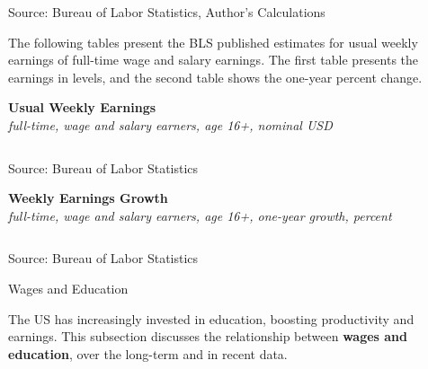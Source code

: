 \documentclass{report}
\newcommand{\tbllink}[1]{\href{https://raw.githubusercontent.com/bdecon/US-chartbook/master/chartbook/data/#1}{\faTable}}
\begin{document}
{\begin{minipage}{1.0\textwidth}
\footnotesize{Source: Bureau of Labor Statistics, Author's Calculations} \hfill \tbllink{uwe_bls_gr.csv} \ \ \tbllink{uwe_cps.csv}
\vspace{2mm}

\small The following tables present the BLS published estimates for usual weekly earnings of full-time wage and salary earnings. The first table presents the earnings in levels, and the second table shows the one-year percent change.
\vspace{2mm}

\normalsize \textbf{Usual Weekly Earnings}\\
\footnotesize{\textit{full-time, wage and salary earners, age 16+, nominal USD}}\\
 \setlength{\tabcolsep}{3.1pt} \color{black!90}
		{\renewcommand{\arraystretch}{1.55}
		 \begin{tabular}{p{17mm} R{8.8mm} R{8.8mm} R{8.8mm} R{8.8mm} R{8.8mm} R{8.8mm} 
		   R{8.8mm} R{8.8mm} R{8.8mm} R{8.8mm}}
			  \hline
		\end{tabular}}
\vspace{-3mm}
		
\footnotesize{Source: Bureau of Labor Statistics}
\vspace{3mm}

\normalsize \textbf{Weekly Earnings Growth}\\
\footnotesize{\textit{full-time, wage and salary earners, age 16+, one-year growth, percent}}\\
 \setlength{\tabcolsep}{3.1pt} \color{black!90}
	{\renewcommand{\arraystretch}{1.55}
		\begin{tabular}{p{17mm} R{8.8mm} R{8.8mm} R{8.8mm} R{8.8mm} R{8.8mm} R{8.8mm} 
		   R{8.8mm} R{8.8mm} R{8.8mm} R{8.8mm}}
			  \hline
		\end{tabular}}\vspace{-2mm}
				
\footnotesize{Source: Bureau of Labor Statistics}
\end{minipage}
\newpage
\vspace*{-10mm}

\begin{minipage}{1.0\textwidth}   
\normalsize{Wages and Education}
\vspace*{-1mm}

\small The US has increasingly invested in education, boosting productivity and earnings. This subsection discusses the relationship between \textbf{wages and education}, over the long-term and in recent data. 


\end{minipage}}
\end{document}
